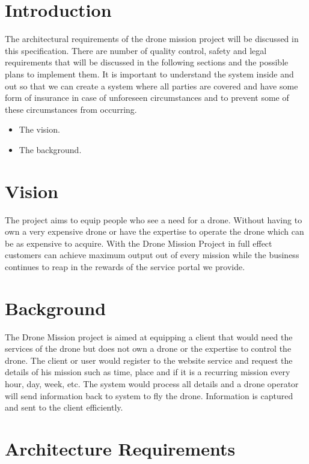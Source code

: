 \documentclass{article}
\begin{document}
	
	\tableofcontents
	\newpage
	
	\newpage %
	\section{Introduction} 
	The architectural requirements of the drone mission project will be discussed in this specification. There are number of quality control, safety and legal requirements that will be discussed in the following sections and the possible plans to implement them. It is important to understand the system inside and out so that we can create a system where all parties are covered and have some form of insurance in case of unforeseen circumstances and to prevent some of these circumstances from occurring.
	\begin{itemize} 
		\item The vision.
		\item The background.
	\end{itemize}
	
	\section{Vision}%
	The project aims to equip people who see a need for a drone. Without having to own a very expensive drone or have the expertise to operate the drone which can be as expensive to acquire. With the Drone Mission Project in full effect customers can achieve maximum output out of every mission while the business continues to reap in the rewards of the service portal we provide.
	
	
	\section{Background} %
	The Drone Mission project is aimed at equipping a client that would need the services of the drone but does not own a drone or the expertise to control the drone. The client or user would register to the website service and request the details of his mission such as time, place and if it is a recurring mission every hour, day, week, etc. The system would process all details and a drone operator will send information back to system to fly the drone. Information is captured and sent to the client efficiently.
	\newpage
	
	\section{Architecture Requirements}%
\end{document}
